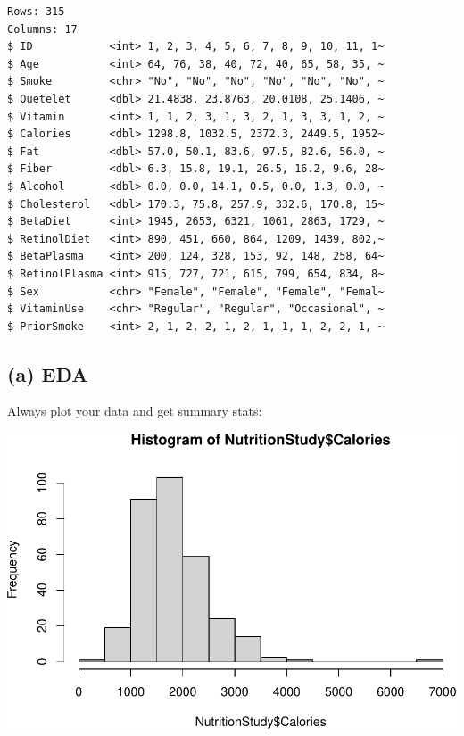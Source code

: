 \documentclass[
]{book}
\newenvironment{Shaded}{\begin{snugshade}}{\end{snugshade}}
\newcommand{\FunctionTok}[1]{\textcolor[rgb]{0.00,0.00,0.00}{#1}}
\newcommand{\NormalTok}[1]{#1}
\newcommand{\SpecialCharTok}[1]{\textcolor[rgb]{0.00,0.00,0.00}{#1}}
\begin{document}
\begin{verbatim}
Rows: 315
Columns: 17
$ ID            <int> 1, 2, 3, 4, 5, 6, 7, 8, 9, 10, 11, 1~
$ Age           <int> 64, 76, 38, 40, 72, 40, 65, 58, 35, ~
$ Smoke         <chr> "No", "No", "No", "No", "No", "No", ~
$ Quetelet      <dbl> 21.4838, 23.8763, 20.0108, 25.1406, ~
$ Vitamin       <int> 1, 1, 2, 3, 1, 3, 2, 1, 3, 3, 1, 2, ~
$ Calories      <dbl> 1298.8, 1032.5, 2372.3, 2449.5, 1952~
$ Fat           <dbl> 57.0, 50.1, 83.6, 97.5, 82.6, 56.0, ~
$ Fiber         <dbl> 6.3, 15.8, 19.1, 26.5, 16.2, 9.6, 28~
$ Alcohol       <dbl> 0.0, 0.0, 14.1, 0.5, 0.0, 1.3, 0.0, ~
$ Cholesterol   <dbl> 170.3, 75.8, 257.9, 332.6, 170.8, 15~
$ BetaDiet      <int> 1945, 2653, 6321, 1061, 2863, 1729, ~
$ RetinolDiet   <int> 890, 451, 660, 864, 1209, 1439, 802,~
$ BetaPlasma    <int> 200, 124, 328, 153, 92, 148, 258, 64~
$ RetinolPlasma <int> 915, 727, 721, 615, 799, 654, 834, 8~
$ Sex           <chr> "Female", "Female", "Female", "Femal~
$ VitaminUse    <chr> "Regular", "Regular", "Occasional", ~
$ PriorSmoke    <int> 2, 1, 2, 2, 1, 2, 1, 1, 1, 2, 2, 1, ~
\end{verbatim}

\hypertarget{a-eda-1}{%
\subsection{(a) EDA}\label{a-eda-1}}

Always plot your data and get summary stats:

\begin{Shaded}
\end{Shaded}

\includegraphics[width=1\linewidth]{Class_Activity_19_files/figure-latex/unnamed-chunk-9-1}
\end{document}
